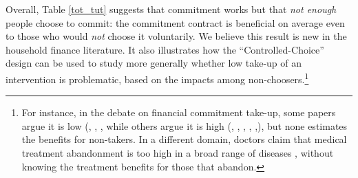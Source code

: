 \documentclass[ecta,nameyear,final]{econsocart}
\begin{document}
Overall, Table \ref{tot_tut} suggests that commitment works but that \emph{not enough} people choose to commit: the commitment contract is beneficial on average even to those who would \emph{not} choose it voluntarily. We believe this result is new in the household finance literature. It also illustrates how the ``Controlled-Choice'' design can be used to study more generally whether low take-up of an intervention is problematic, based on the impacts among non-choosers.\footnote{For instance, in the debate on financial commitment take-up, some papers argue it is low (\cite{Ashraf}, \cite{Gine}, \cite{Ted}, \cite{Royer} while others argue it is high (\cite{Kremer}, \cite{Casaburi}, \cite{Alcohol}, \cite{AprajitP&P}, \cite{Pascaline},), but none estimates the benefits for non-takers. In a different domain, doctors claim that medical treatment abandonment is too high in a broad range of diseases \citep{non_adherence}, without knowing the treatment benefits for those that abandon.}



\end{document}
